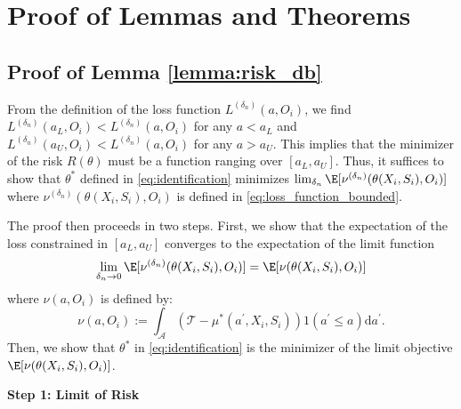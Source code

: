 

\section{Proof of Lemmas and Theorems}\label{sec:proof}

\subsection{Proof of Lemma \ref{lemma:risk_db}}



From the definition of the loss function $L^{({\delta_n})}(a,O_i)$, we find $L^{({\delta_n})}(a_L,O_i)< L^{({\delta_n})}(a,O_i)$ for any $a< a_L$ and $L^{({\delta_n})}(a_U,O_i)< L^{({\delta_n})}(a,O_i)$ for any $a> a_U$. This implies that the minimizer of the risk $R(\theta)$ must be a function ranging over $[a_L,a_U]$. Thus, it suffices to show that $\theta^*$ defined in \eqref{eq:identification} minimizes $\lim_{{\delta_n}}\E[\nu^{(\delta_n)}(\theta(X_i,S_i),O_i)]$ where $\nu^{(\delta_n)}(\theta(X_i,S_i),O_i)$ is defined in \eqref{eq:loss_function_bounded}. 

The proof then proceeds in two steps. First, we show that the expectation of the loss constrained in $[a_L,a_U]$ converges to the expectation of the limit function$$\lim_{{\delta_n\rightarrow 0}}\E[\nu^{(\delta_n)}(\theta(X_i,S_i),O_i)] = \E[\nu(\theta(X_i,S_i),O_i)]$$
where $\nu(a,O_i)$ is defined by:
$$\nu(a,O_i):= \int_{\mathcal{A}} \left( \mathcal{T} - \mu^*(a^\prime, X_i, S_i) \right) 1(a^\prime \leq a) \mathrm{d}a^\prime.$$
Then, we show that $\theta^*$ in \eqref{eq:identification} is the minimizer of the limit objective $\E[\nu(\theta(X_i,S_i),O_i)]$.

\noindent \textbf{Step 1: Limit of Risk}

